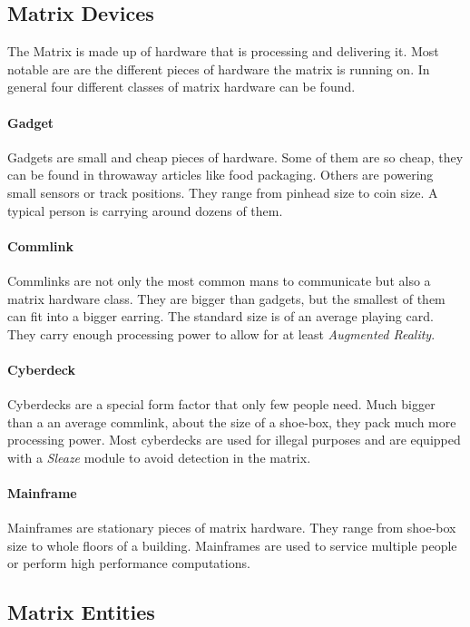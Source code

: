 \subsection{Matrix Devices}

The Matrix is made up of hardware that is processing and delivering it. Most
notable are are the different pieces of hardware the matrix is running on. In
general four different classes of matrix hardware can be found.

\paragraph{Gadget}
Gadgets are small and cheap pieces of hardware. Some of them are so cheap, they
can be found in throwaway articles like food packaging. Others are powering small
sensors or track positions. They range from pinhead size to coin size.
A typical person is carrying around dozens of them.

\paragraph{Commlink}
Commlinks are not only the most common mans to communicate but also a matrix
hardware class. They are bigger than gadgets, but the smallest of them can fit
into a bigger earring. The standard size is of an average playing card. They
carry enough processing power to allow for at least \emph{Augmented Reality}.

\paragraph{Cyberdeck}
Cyberdecks are a special form factor that only few people need. Much bigger than
a an average commlink, about the size of a shoe-box, they pack much more
processing power. Most cyberdecks are used for illegal purposes and are equipped
with a \emph{Sleaze} module to avoid detection in the matrix.

\paragraph{Mainframe}
Mainframes are stationary pieces of matrix hardware. They range from shoe-box
size to whole floors of a building. Mainframes are used to service multiple people
or perform high performance computations.


\subsection{Matrix Entities}

